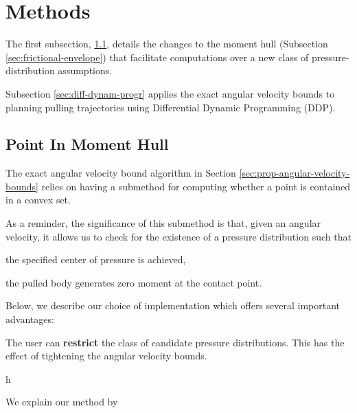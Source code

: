 \documentclass[conference]{IEEEtran}
\begin{document}
\section{Methods}



The first subsection, \ref{sec:point-in-moment-hull}, details the
changes to the moment hull (Subsection \ref{sec:frictional-envelope})
that facilitate computations over a new class of pressure-distribution
assumptions.

Subsection \ref{sec:diff-dynam-progr} applies the exact angular
velocity bounds to planning pulling trajectories using Differential
Dynamic Programming (DDP).

\subsection{Point In Moment Hull}\label{sec:point-in-moment-hull}

\begin{inparaenum}
\item The exact angular velocity bound algorithm in Section
  \ref{sec:prop-angular-velocity-bounds} relies on having a submethod
  for computing whether a point is contained in a convex set.
\item As a reminder, the significance of this submethod is that, given
  an angular velocity, it allows us to check for the existence of a
  pressure distribution such that
  \begin{inparaenum}
  \item the specified center of pressure is achieved,
  \item the pulled body generates zero moment at the contact point.
  \end{inparaenum}
\item Below, we describe our choice of implementation which offers
  several important advantages:
  \begin{inparaenum}
  \item The user can \textbf{restrict} the class of candidate pressure
    distributions. This has the effect of tightening the angular
    velocity bounds.
  \end{inparaenum}
\end{inparaenum}
h

We explain our method by 
\end{document}
